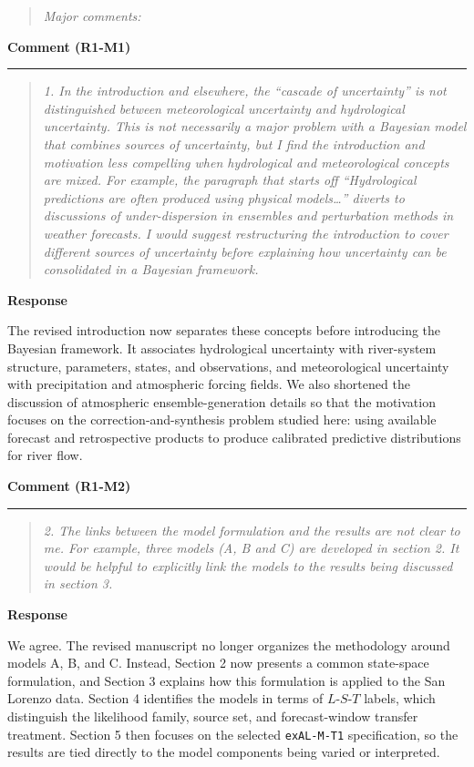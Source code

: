 \documentclass[11pt,letterpaper]{article}
\newcommand{\commentheading}[1]{%
  \vspace{6pt}\noindent\textbf{Comment (#1)}\par
  \vspace{2pt}\hrule\vspace{6pt}
}
\newenvironment{commentblock}{\begin{quote}\small\itshape}{\end{quote}}
\newcommand{\responseheading}{%
  \vspace{2pt}\noindent\textbf{Response}\par
}
\newenvironment{responsebox}{\begin{mdframed}[style=plainbox]}{\end{mdframed}}
\newcommand{\RoneM}[1]{R1-M#1}
\begin{document}
\begin{commentblock}
Major comments:
\end{commentblock}

\commentheading{\RoneM{1}}
\begin{commentblock}
1. In the introduction and elsewhere, the “cascade of uncertainty” is not distinguished between meteorological uncertainty and hydrological uncertainty. This is not necessarily a major problem with a Bayesian model that combines sources of uncertainty, but I find the introduction and motivation less compelling when hydrological and meteorological concepts are mixed. For example, the paragraph that starts off “Hydrological predictions are often produced using physical models…” diverts to discussions of under-dispersion in ensembles and perturbation methods in weather forecasts. I would suggest restructuring the introduction to cover different sources of uncertainty before explaining how uncertainty can be consolidated in a Bayesian framework.
\end{commentblock}
\responseheading
\begin{responsebox}
The revised introduction now separates these concepts before introducing the Bayesian framework. It associates hydrological uncertainty with river-system structure, parameters, states, and observations, and meteorological uncertainty with precipitation and atmospheric forcing fields. We also shortened the discussion of atmospheric ensemble-generation details so that the motivation focuses on the correction-and-synthesis problem studied here: using available forecast and retrospective products to produce calibrated predictive distributions for river flow.
\end{responsebox}

\commentheading{\RoneM{2}}
\begin{commentblock}
2. The links between the model formulation and the results are not clear to me. For example, three models (A, B and C) are developed in section 2. It would be helpful to explicitly link the models to the results being discussed in section 3.
\end{commentblock}
\responseheading
\begin{responsebox}
We agree. The revised manuscript no longer organizes the methodology around models A, B, and C. Instead, Section 2 now presents a common state-space formulation, and Section 3 explains how this formulation is applied to the San Lorenzo data. Section 4 identifies the models in terms of \(L\)-\(S\)-\(T\) labels, which distinguish the likelihood family, source set, and forecast-window transfer treatment. Section 5 then focuses on the selected \texttt{exAL-M-T1} specification, so the results are tied directly to the model components being varied or interpreted.
\end{responsebox}
\end{document}
